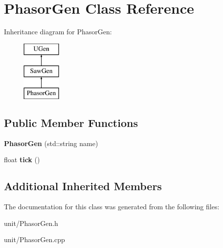 \hypertarget{classPhasorGen}{}\section{Phasor\+Gen Class Reference}
\label{classPhasorGen}
Inheritance diagram for Phasor\+Gen\+:\begin{figure}[H]
\begin{center}
\leavevmode
\includegraphics[height=3.000000cm]{classPhasorGen}
\end{center}
\end{figure}
\subsection*{Public Member Functions}
\begin{DoxyCompactItemize}
\item 
{\bfseries Phasor\+Gen} (std\+::string name)\hypertarget{classPhasorGen_a726fab6730e45d7fbf242f4613837e28}{}\label{classPhasorGen_a726fab6730e45d7fbf242f4613837e28}

\item 
float {\bfseries tick} ()\hypertarget{classPhasorGen_a056953090628af9868e4778d15daf79a}{}\label{classPhasorGen_a056953090628af9868e4778d15daf79a}

\end{DoxyCompactItemize}
\subsection*{Additional Inherited Members}


The documentation for this class was generated from the following files\+:\begin{DoxyCompactItemize}
\item 
unit/Phasor\+Gen.\+h\item 
unit/Phasor\+Gen.\+cpp\end{DoxyCompactItemize}

